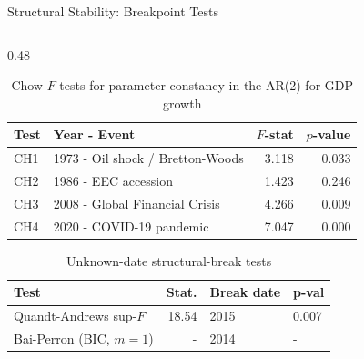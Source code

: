 \documentclass[9pt]{beamer}
\begin{document}
\begin{frame}{Structural Stability: Breakpoint Tests}
\footnotesize

\begin{columns}
  \begin{column}{0.48\textwidth}
    \begin{table}[ht]
    \tiny
    \centering
    \caption{\footnotesize Chow $F$-tests for parameter constancy in the AR(2) for GDP growth}
    \begin{tabular}{llrr}
    \toprule
    \textbf{Test} & \textbf{Year - Event} & \textbf{$F$-stat} & \textbf{$p$-value} \\
    \midrule
    CH1 & 1973 - Oil shock / Bretton-Woods & 3.118 & 0.033 \\
    CH2 & 1986 - EEC accession             & 1.423 & 0.246 \\
    CH3 & 2008 - Global Financial Crisis    & 4.266 & 0.009 \\
    CH4 & 2020 - COVID-19 pandemic          & 7.047 & 0.000 \\
    \bottomrule
    \end{tabular}
    \end{table}

    \begin{table}[ht]
    \tiny
    \centering
    \caption{\footnotesize Unknown-date structural-break tests}
    \begin{tabular}{lrll}
    \toprule
    \textbf{Test} & \textbf{Stat.} & \textbf{Break date} & \textbf{p-val} \\
    \midrule
    Quandt-Andrews sup-$F$ & 18.54 & 2015 & 0.007 \\
    Bai-Perron (BIC, $m=1$) & -  & 2014 & -   \\
    \bottomrule
    \end{tabular}
    \end{table}
  \end{column}


\end{columns}
\end{frame}
\end{document}
